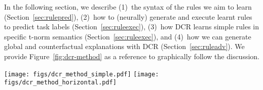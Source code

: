In the following section, we describe \mbox{(1) the} syntax of the rules we aim to learn (Section~\ref{sec:rulepred}), \mbox{(2) how} to (neurally) generate and execute learnt rules to predict task labels (Section~\ref{sec:ruleexec}), (\mbox{3) how} DCR learns simple rules in specific t-norm semantics (Section~\ref{sec:ruleexec}), and \mbox{(4) how} we can generate global and counterfactual explanations with DCR (Section~\ref{sec:ruleadv}). We provide Figure~\ref{fig:dcr-method} as a reference to graphically follow the discussion.


\begin{figure*}[!t]
    \centering
    \texttt{[image: figs/dcr\_method\_simple.pdf]}
    \qquad
    \texttt{[image: figs/dcr\_method\_horizontal.pdf]}
    \caption{(left) Deep Concept Reasoner (DCR) generates fuzzy logic rules using neural models on concept embeddings. Then DCR executes the rule using the concept truth degrees to evaluate the rule symbolically. (right) Schema of DCR modules: first neural models $\phi$ and $\psi$ generate the rule, and then the rule is executed symbolically.}
    \label{fig:dcr-method}
\end{figure*}


